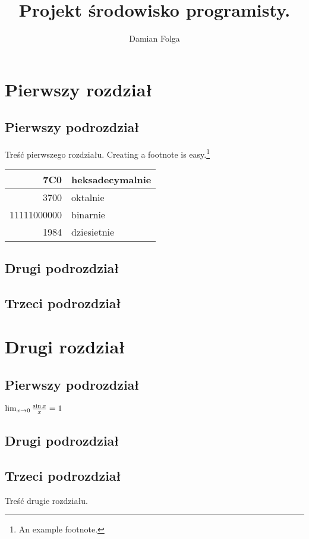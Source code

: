 \documentclass[12pt,a4paper,titlepage]{report}
\author{Damian Folga}
\title{Projekt środowisko programisty.}
\begin{document}
\maketitle
\tableofcontents
\newpage
\chapter{Pierwszy rozdział}
\section{Pierwszy podrozdział}
Treść pierwszego rozdziału.
Creating a footnote is easy.\footnote{An example footnote.}

\begin{tabular}{|r|l|} \hline
7C0 & heksadecymalnie \\
\hline \hline
3700 & oktalnie \\
\hline \hline
11111000000 & binarnie \\
\hline \hline
1984 & dziesietnie \\ \hline

\end{tabular}

\section{Drugi podrozdział}
\section{Trzeci podrozdział}
\newpage
\chapter{Drugi rozdział}
\section{Pierwszy podrozdział}
\begin{math}
 $$
\lim_{x \rightarrow 0} \frac{\sin x}{x}=1
$$
\end{math}

\section{Drugi podrozdział}
\section{Trzeci podrozdział}
\cite{pa}Treść drugie rozdziału.
\end{document}
